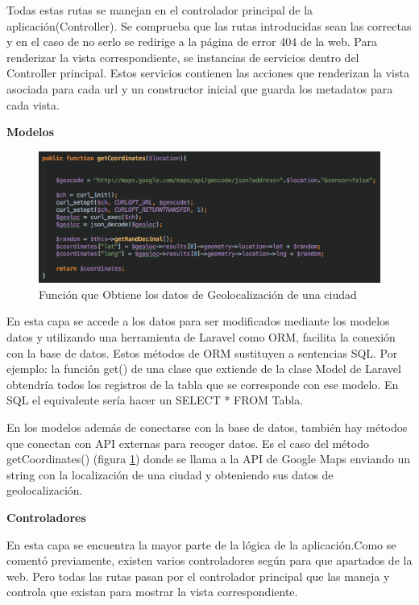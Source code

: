 Todas estas rutas se manejan en el controlador principal de la aplicación(Controller). Se comprueba que las rutas introducidas sean las correctas y en el caso de no serlo se redirige a la página de error 404 de la web. Para renderizar la vista correspondiente, se instancias de servicios dentro del Controller principal. Estos servicios contienen las acciones que renderizan la vista asociada para cada url y un constructor inicial que guarda los metadatos para cada vista.

\vspace{5 mm}

\textbf{Modelos}

\begin{figure}
\begin{center}
\includegraphics[width=1.0\textwidth]{imagenes/getGeocode.png}
\caption{Función que Obtiene los datos de Geolocalización de una ciudad}
\label{getCordinates-app}
\end{center}
\end{figure}

En esta capa se accede a los datos para ser modificados mediante los modelos datos y utilizando una herramienta de Laravel como ORM, facilita la conexión
con la base de datos. Estos métodos de ORM sustituyen a sentencias SQL. Por ejemplo: la función get() de una clase que extiende de la clase Model de Laravel
obtendría todos los registros de la tabla que se corresponde con ese modelo. En SQL el equivalente sería hacer un SELECT * FROM Tabla.


En los modelos además de conectarse con la base de datos, también hay métodos que conectan con API externas para recoger datos. Es el caso del método getCoordinates()
(figura \ref{getCordinates-app}) donde se llama a la API de Google Maps enviando un string con la localización de una ciudad y obteniendo sus datos de
geolocalización.


\textbf{Controladores}

En esta capa se encuentra la mayor parte de la lógica de la aplicación.Como se comentó previamente, existen varios controladores según para que
apartados de la web. Pero todas las rutas pasan por el controlador principal que las maneja y controla que existan para mostrar la vista correspondiente.

